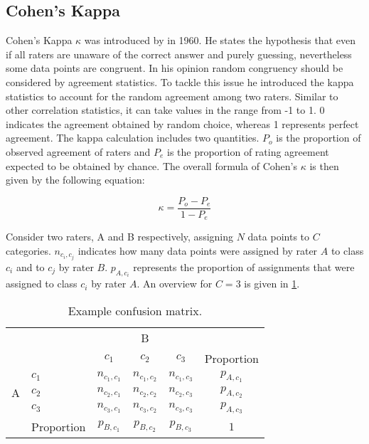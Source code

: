 \subsection{Cohen's Kappa}
\label{chp:fundamentals:sec:inter_rater_agreement:subsec:cohens_kappa}
Cohen's Kappa $\kappa$ was introduced by \textcite{Cohen:1960} in 1960.
He states the hypothesis that even if all raters are unaware of the correct answer and purely guessing, nevertheless some data points are congruent.
In his opinion random congruency should be considered by agreement statistics.
To tackle this issue he introduced the kappa statistics to account for the random agreement among two raters.
Similar to other correlation statistics, it can take values in the range from -1 to 1.
0 indicates the agreement obtained by random choice, whereas 1 represents perfect agreement.
The kappa calculation includes two quantities.
$P_o$ is the proportion of observed agreement of raters and $P_e$ is the proportion of rating agreement expected to be obtained by chance.
The overall formula of Cohen's $\kappa$ is then given by the following equation:

\begin{equation}\label{eq:Cohens_kappa}
    \kappa = \frac{P_o - P_e}{1 - P_e}
\end{equation}

Consider two raters, A and B respectively, assigning $N$ data points to $C$ categories.
$n_{c_i, c_j}$ indicates how many data points were assigned by rater $A$ to class $c_i$ and to $c_j$ by rater $B$.
$p_{A, c_i}$ represents the proportion of assignments that were assigned to class $c_i$ by rater $A$.
An overview for $C=3$ is given in \cref{tab:cohens_kappa_sample_definition}.

\begin{table}[htpb]
    \centering
    \begin{tabular}{l|l|c|c|c|c}
        \multicolumn{2}{c}{}&\multicolumn{3}{c}{B}&\\
        \cline{3-5}
        \multicolumn{2}{c|}{}&$c_1$&$c_2$&$c_3$&\multicolumn{1}{c}{Proportion}\\
        \cline{2-5}
        \multirow{3}{*}{A}& $c_1$ & $n_{c_1, c_1}$ & $n_{c_1, c_2}$ &$n_{c_1, c_3}$& $p_{A, c_1}$\\
        \cline{2-5}
        & $c_2$ & $n_{c_2, c_1}$ & $n_{c_2, c_2}$ &$n_{c_2, c_3}$&$p_{A, c_2}$\\
        \cline{2-5}
        & $c_3$ & $n_{c_3, c_1}$ & $n_{c_3, c_2}$ &$n_{c_3, c_3}$ & $p_{A, c_3}$\\
        \cline{2-5}
        \multicolumn{1}{c}{} & \multicolumn{1}{c}{Proportion} & \multicolumn{1}{c}{$p_{B, c_1}$} & \multicolumn{1}{c}{$p_{B, c_2}$} & \multicolumn{1}{c}{$p_{B, c_3}$} & \multicolumn{1}{c}{$1$}\\
    \end{tabular}
    \caption[Cohen's Kappa notation overview]{Example confusion matrix.}\label{tab:cohens_kappa_sample_definition}
\end{table}

